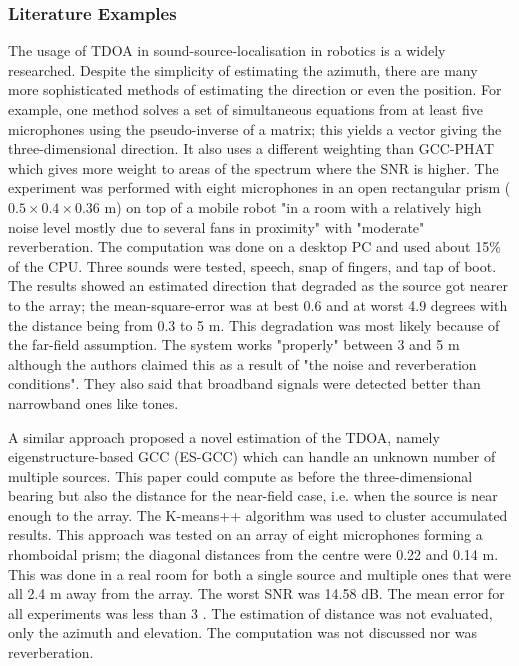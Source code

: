 \documentclass{report}
\begin{document}
\subsubsection{Literature Examples}

The usage of TDOA in sound-source-localisation in robotics is a widely researched. Despite the simplicity of estimating the azimuth, there are many more sophisticated methods of estimating the direction or even the position. For example, one method \cite{valin_robust_2003} solves a set of simultaneous equations from at least five microphones using the pseudo-inverse of a matrix; this yields a vector giving the three-dimensional direction. It also uses a different weighting than GCC-PHAT which gives more weight to areas of the spectrum where the SNR is higher. The experiment was performed with eight microphones in an open rectangular prism ($0.5\times 0.4\times 0.36$ \si{m}) on top of a mobile robot "in a room with a relatively high noise level mostly due to several fans in proximity" with "moderate" reverberation. The computation was done on a desktop PC and used about 15\% of the CPU. Three sounds were tested, speech, snap of fingers, and tap of boot. The results showed an estimated direction that degraded as the source got nearer to the array; the mean-square-error was at best 0.6 and at worst 4.9 degrees with the distance being from 0.3 to 5 \si{m}. This degradation was most likely because of the far-field assumption. The system works "properly" between 3 and 5 \si{m} although the authors claimed this as a result of "the noise and reverberation conditions". They also said that broadband signals were detected better than narrowband ones like tones.

A similar approach \cite{hu_estimation_2009} proposed a novel estimation of the TDOA, namely eigenstructure-based GCC (ES-GCC) which can handle an unknown number of multiple sources. This paper could compute as before the three-dimensional bearing but also the distance for the near-field case, i.e. when the source is near enough to the array. The K-means++ algorithm was used to cluster accumulated results. This approach was tested on an array of eight microphones forming a rhomboidal prism; the diagonal distances from the centre were 0.22 and 0.14 \si{m}. This was done in a real room for both a single source and multiple ones that were all 2.4 \si{m} away from the array. The worst SNR was 14.58 \si{dB}. The mean error for all experiments was less than 3 \si{\deg}. The estimation of distance was not evaluated, only the azimuth and elevation. The computation was not discussed nor was reverberation.
\end{document}
